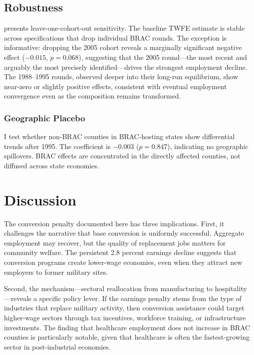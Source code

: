 \documentclass[12pt]{article}
\begin{document}
\subsection{Robustness}



 presents leave-one-cohort-out sensitivity. The baseline TWFE estimate is stable across specifications that drop individual BRAC rounds. The exception is informative: dropping the 2005 cohort reveals a marginally significant negative effect ($-0.015$, $p = 0.068$), suggesting that the 2005 round---the most recent and arguably the most precisely identified---drives the strongest employment decline. The 1988--1995 rounds, observed deeper into their long-run equilibrium, show near-zero or slightly positive effects, consistent with eventual employment convergence even as the composition remains transformed.

\subsubsection*{Geographic Placebo} I test whether non-BRAC counties in BRAC-hosting states show differential trends after 1995. The coefficient is $-0.003$ ($p = 0.847$), indicating no geographic spillovers. BRAC effects are concentrated in the directly affected counties, not diffused across state economies.

\section{Discussion}

The conversion penalty documented here has three implications. First, it challenges the narrative that base conversion is uniformly successful. Aggregate employment may recover, but the quality of replacement jobs matters for community welfare. The persistent 2.8 percent earnings decline suggests that conversion programs create lower-wage economies, even when they attract new employers to former military sites.

Second, the mechanism---sectoral reallocation from manufacturing to hospitality---reveals a specific policy lever. If the earnings penalty stems from the type of industries that replace military activity, then conversion assistance could target higher-wage sectors through tax incentives, workforce training, or infrastructure investments. The finding that healthcare employment does not increase in BRAC counties is particularly notable, given that healthcare is often the fastest-growing sector in post-industrial economies.
\end{document}
